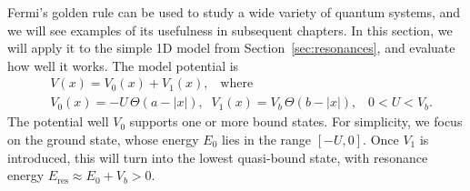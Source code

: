 \documentclass[pra,12pt]{revtex4}
\begin{document}
Fermi's golden rule can be used to study a wide variety of quantum
systems, and we will see examples of its usefulness in subsequent
chapters.  In this section, we will apply it to the simple 1D model
from Section~\ref{sec:resonances}, and evaluate how well it works.
The model potential is
\begin{equation}
  \begin{aligned}&V(x) = V_0(x) + V_1(x), \;\;\;\mathrm{where} \\ &V_0(x) = -U \, \Theta(a-|x|), \;\; V_1(x) = V_b\, \Theta(b-|x|), \;\;\; 0<U<V_b.\end{aligned}
\end{equation}
The potential well $V_0$ supports one or more bound states.  For
simplicity, we focus on the ground state, whose energy $E_0$ lies in
the range $[-U,0]$.  Once $V_1$ is introduced, this will turn into the
lowest quasi-bound state, with resonance energy $E_{\mathrm{res}}
\approx E_0 + V_b > 0$.
\end{document}
